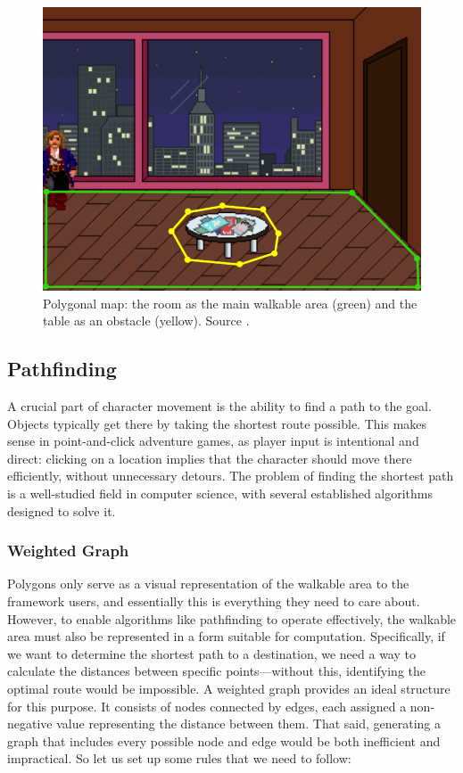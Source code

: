 \begin{figure}[H]
\centering
\includegraphics[width=.8\linewidth]{img/WS-polygons4.png}
\caption{Polygonal map: the room as the main walkable area (green) and the table as an obstacle (yellow). Source \cite{Uurloon1}.}
\label{fig:WS:Poly}
\end{figure}

\subsection{Pathfinding}
A crucial part of character movement is the ability to find a path to the goal. Objects typically get there by taking the shortest route possible. This makes sense in point-and-click adventure games, as player input is intentional and direct: clicking on a location implies that the character should move there efficiently, without unnecessary detours. The problem of finding the shortest path is a well-studied field in computer science, with several established algorithms designed to solve it. 

\subsubsection{Weighted Graph}
Polygons only serve as a visual representation of the walkable area to the framework users, and essentially this is everything they need to care about. However, to enable algorithms like pathfinding to operate effectively, the walkable area must also be represented in a form suitable for computation. Specifically, if we want to determine the shortest path to a destination, we need a way to calculate the distances between specific points—without this, identifying the optimal route would be impossible. A weighted graph provides an ideal structure for this purpose. It consists of nodes connected by edges, each assigned a non-negative value representing the distance between them. That said, generating a graph that includes every possible node and edge would be both inefficient and impractical. So let us set up some rules that we need to follow:

